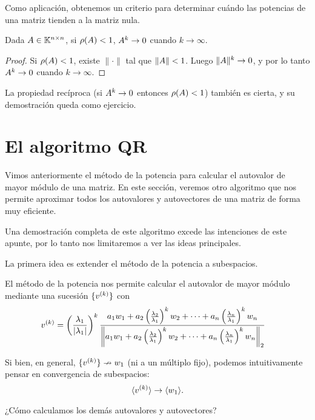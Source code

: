 Como aplicación, obtenemos un criterio para determinar cuándo las potencias de una matriz tienden a la matriz nula.

\begin{prop}
Dada $\Ab \in \Knn$, si $\rho(\Ab) < 1$, $\Ab^k \rightarrow \cero$ cuando $k \rightarrow \infty$.
\end{prop}
\begin{proof}
Si $\rho(\Ab) < 1$, existe $\|\cdot\|$ tal que $\|\Ab\| < 1$. Luego $\|\Ab\|^k \rightarrow 0$, y por lo tanto $\Ab^k \rightarrow \cero$ cuando $k \rightarrow \infty$.
\end{proof}

La propiedad recíproca (si $\Ab^k \rightarrow 0$ entonces $\rho(\Ab) < 1$) también es cierta, y su demostración queda como ejercicio.


\section{El algoritmo QR}

Vimos anteriormente el método de la potencia para calcular el autovalor de mayor módulo de una matriz. En este sección, veremos otro algoritmo que nos permite aproximar todos los autovalores y autovectores de una matriz de forma muy eficiente.

Una demostración completa de este algoritmo excede las intenciones de este apunte, por lo tanto nos limitaremos a ver las ideas principales.

La primera idea es extender el método de la potencia a subespacios.

El método de la potencia nos permite calcular el autovalor de mayor módulo mediante una sucesión $\{\vb^{(k)}\}$ con
$$
\begin{aligned}
\vb^{(k)} &= \left(\frac{\lambda_1}{|\lambda_1|}\right)^k \frac{a_1   \wb_1 + a_2 \left(\frac{\lambda_2}{\lambda_1}\right)^k \wb_2+ \dots + a_n \left(\frac{\lambda_n}{\lambda_1}\right)^k \wb_n}{\left\|a_1 \wb_1 + a_2 \left(\frac{\lambda_2}{\lambda_1}\right)^k \wb_2+ \dots + a_n \left(\frac{\lambda_n}{\lambda_1}\right)^k \wb_n\right\|_2}
\end{aligned}$$

Si bien, en general, $\{\vb^{(k)}\} \nrightarrow \wb_1$ (ni a un múltiplo fijo), podemos intuitivamente pensar en convergencia de subespacios:
$$
\langle \vb^{(k)}\rangle \rightarrow \langle \wb_1 \rangle.
$$

¿Cómo calculamos los demás autovalores y autovectores?

